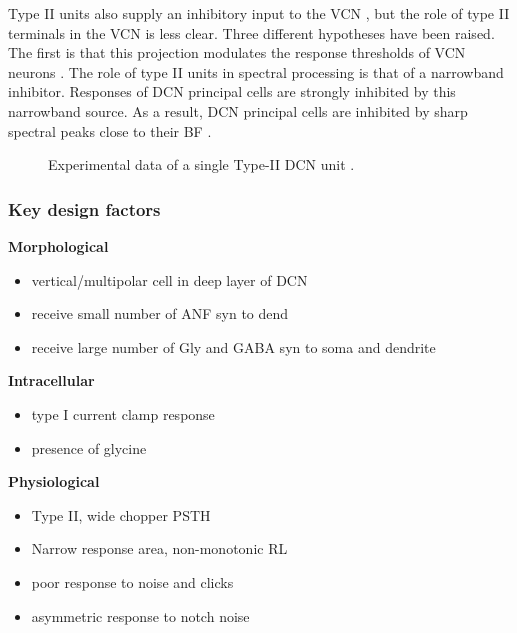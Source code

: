 Type II units also supply an inhibitory input to the VCN
\citep{WickesbergOertel:1990}, but the role of type II terminals in the VCN is
less clear. Three different hypotheses have been raised. The ﬁrst is that this
projection modulates the response thresholds of VCN neurons
\citep{PaoliniClark:1998}.  The role of type II units in spectral processing is
that of a narrowband inhibitor. Responses of DCN principal cells are strongly
inhibited by this narrowband source. As a result, DCN principal cells are
inhibited by sharp spectral peaks close to their BF
\citep{SpirouDavisEtAl:1999}.

\begin{figure}[htb]
  \centering
{}
\caption{Experimental data of a single Type-II DCN unit \citep[Fig.~1]{SpirouDavisEtAl:1999}.}
  \label{fig:SpirouFig1}
\end{figure}


\subsubsection{Key design factors}


\textbf{Morphological}
\begin{itemize}
\item vertical/multipolar cell in deep layer of DCN \citep{Rhode:1999}
\item receive small number of ANF syn to dend
\item receive large number of Gly and GABA syn to soma and dendrite
\end{itemize}

\textbf{Intracellular}
\begin{itemize}
\item type I current clamp response
\item presence of glycine \citep{OertelWickesberg:1993}
\end{itemize}


\textbf{Physiological}
\begin{itemize}
\item Type II, wide chopper PSTH
  \citep{Rhode:1999,SpirouDavisEtAl:1999}
\item Narrow response area, non-monotonic RL
\item poor response to noise and clicks
\item asymmetric response to notch noise \citep{ReissYoung:2005}
\end{itemize}



